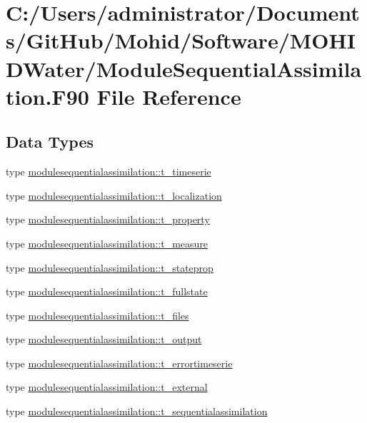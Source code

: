\hypertarget{_module_sequential_assimilation_8_f90}{}\section{C\+:/\+Users/administrator/\+Documents/\+Git\+Hub/\+Mohid/\+Software/\+M\+O\+H\+I\+D\+Water/\+Module\+Sequential\+Assimilation.F90 File Reference}
\label{_module_sequential_assimilation_8_f90}
\subsection*{Data Types}
\begin{DoxyCompactItemize}
\item 
type \mbox{\hyperlink{structmodulesequentialassimilation_1_1t__timeserie}{modulesequentialassimilation\+::t\+\_\+timeserie}}
\item 
type \mbox{\hyperlink{structmodulesequentialassimilation_1_1t__localization}{modulesequentialassimilation\+::t\+\_\+localization}}
\item 
type \mbox{\hyperlink{structmodulesequentialassimilation_1_1t__property}{modulesequentialassimilation\+::t\+\_\+property}}
\item 
type \mbox{\hyperlink{structmodulesequentialassimilation_1_1t__measure}{modulesequentialassimilation\+::t\+\_\+measure}}
\item 
type \mbox{\hyperlink{structmodulesequentialassimilation_1_1t__stateprop}{modulesequentialassimilation\+::t\+\_\+stateprop}}
\item 
type \mbox{\hyperlink{structmodulesequentialassimilation_1_1t__fullstate}{modulesequentialassimilation\+::t\+\_\+fullstate}}
\item 
type \mbox{\hyperlink{structmodulesequentialassimilation_1_1t__files}{modulesequentialassimilation\+::t\+\_\+files}}
\item 
type \mbox{\hyperlink{structmodulesequentialassimilation_1_1t__output}{modulesequentialassimilation\+::t\+\_\+output}}
\item 
type \mbox{\hyperlink{structmodulesequentialassimilation_1_1t__errortimeserie}{modulesequentialassimilation\+::t\+\_\+errortimeserie}}
\item 
type \mbox{\hyperlink{structmodulesequentialassimilation_1_1t__external}{modulesequentialassimilation\+::t\+\_\+external}}
\item 
type \mbox{\hyperlink{structmodulesequentialassimilation_1_1t__sequentialassimilation}{modulesequentialassimilation\+::t\+\_\+sequentialassimilation}}
\end{DoxyCompactItemize}
